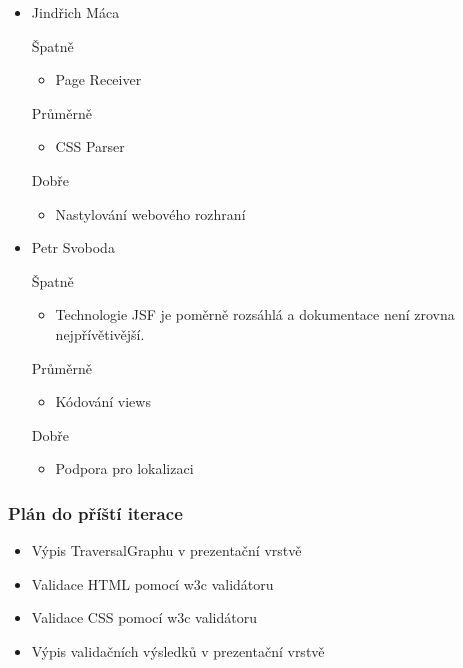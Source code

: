 \documentclass{beamer}
\begin{document}
\begin{frame}[allowframebreaks]
\begin{itemize}
    \item Jindřich Máca
      \begin{block}{Špatně} %
       \begin{itemize}
        \item Page Receiver
       \end{itemize}
     \end{block}
     \begin{block}{Průměrně} %
        \begin{itemize}
        \item CSS Parser
       \end{itemize}
     \end{block}
     \begin{block}{Dobře} %
       \begin{itemize}
        \item Nastylování webového rozhraní
       \end{itemize}
     \end{block}
   
    \item Petr Svoboda
      \begin{block}{Špatně} %
       \begin{itemize}
        \item Technologie JSF je poměrně rozsáhlá a dokumentace není zrovna nejpřívětivější.
       \end{itemize}
     \end{block}
     \begin{block}{Průměrně} %
        \begin{itemize}
        \item Kódování views
       \end{itemize}
     \end{block}
     \begin{block}{Dobře} %
       \begin{itemize}
        \item Podpora pro lokalizaci
       \end{itemize}
     \end{block}
   \end{itemize}
\end{frame}

\begin{frame}[allowframebreaks]\frametitle{Plán do příští iterace}
  \begin{itemize}
    \item Výpis TraversalGraphu v prezentační vrstvě
		\item Validace HTML pomocí w3c validátoru
		\item Validace CSS pomocí w3c validátoru
		\item Výpis validačních výsledků v prezentační vrstvě
  \end{itemize}
\end{frame}
\end{document}
